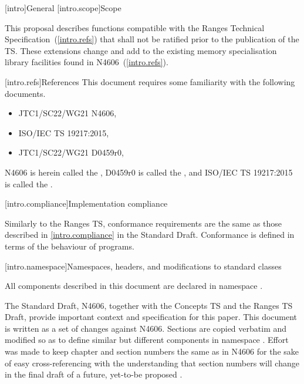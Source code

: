 [intro]{General}
[intro.scope]{Scope}

\pnum
This proposal describes functions compatible with the Ranges Technical
Specification~(\ref{intro.refs}) that shall not be ratified prior to the
publication of the TS. These extensions change and add to the existing
memory specialisation library facilities found in N4606~(\ref{intro.refs}).

[intro.refs]{References}
This document requires some familiarity with the following documents.

\begin{itemize}
\item JTC1/SC22/WG21 N4606,   
\item ISO/IEC TS 19217:2015,  
\item JTC1/SC22/WG21 D0459r0, 
\end{itemize}

N4606 is herein called the , D0459r0 is called the ,
and ISO/IEC TS 19217:2015 is called the .

[intro.compliance]{Implementation compliance}

\pnum
Similarly to the Ranges TS, conformance requirements are the same as those described in
\ref{intro.compliance} in the \Cpp Standard Draft.
\enternote
Conformance is defined in terms of the behaviour of programs.
\exitnote

[intro.namespace]{Namespaces, headers, and modifications to standard classes}

\pnum
All components described in this document are declared in namespace .


\pnum
The \Cpp Standard Draft, N4606, together with the Concepts TS and the Ranges
TS Draft, provide important context and specification for this paper. This
document is written as a set of changes against N4606. Sections are copied
verbatim and modified so as to define similar but different components in
namespace . Effort was made to keep
chapter and section numbers the same as in N4606 for the sake of easy
cross-referencing with the understanding that section numbers will change in
the final draft of a future, yet-to-be proposed .


